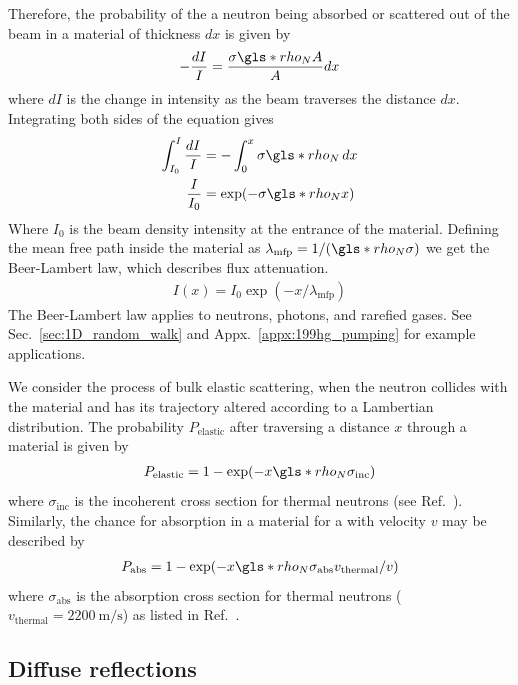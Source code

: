 Therefore, the probability of the a neutron being absorbed or scattered out of the beam in a material of thickness $dx$ is given by
%
\begin{gather}
    -\frac{dI}{I}=\frac{\sigma\gls*{rho_N} A}{A}dx
\end{gather}
%
where $dI$ is the change in intensity as the beam traverses the distance $dx$. Integrating both sides of the equation gives
%
\begin{align}
    \int^I_{I_0}\frac{dI}{I} &= -\int^x_0 \sigma \gls*{rho_N} \,dx \\
    \frac{I}{I_0} &= \exp(-\sigma \gls*{rho_N} x) \label{eq:beer_lambert_law_variant}
\end{align}
%
Where $I_0$ is the beam density intensity at the entrance of the material. Defining the mean free path inside the material as $\lambda_\text{mfp}=1/(\gls*{rho_N} \sigma)$ we get the Beer-Lambert law, which describes flux attenuation.
%
\begin{gather}
    I(x) = I_0 \exp(-x/\lambda_\text{mfp}) \label{eq:beer_lambert_law}
\end{gather}
%
 The Beer-Lambert law applies to neutrons, photons, and rarefied gases. See Sec.~\ref{sec:1D_random_walk} and Appx.~\ref{appx:199hg_pumping} for example applications.
 
 We consider the process of bulk elastic scattering, when the neutron collides with the material and has its trajectory altered according to a Lambertian distribution. The probability $P_\text{elastic}$ after traversing a distance $x$ through a material is given by
%
\begin{gather}
    P_\text{elastic}=1-\exp(-x \gls*{rho_N} \sigma_\text{inc})
\end{gather}
%
where $\sigma_\text{inc}$ is the incoherent cross section for thermal neutrons (see Ref.~\cite{nist_neutron_cross_sections}). Similarly, the chance for absorption in a material for a \ucn with velocity $v$ may be described by
%
\begin{gather}
    P_\text{abs}= 1-\exp(-x \gls*{rho_N} \sigma_\text{abs}v_\text{thermal}/v)
\end{gather}
%
where $\sigma_\text{abs}$ is the absorption cross section for thermal neutrons ($v_\text{thermal}=\qty{2200}{\meter\per \s}$) as listed in Ref.~\cite{nist_neutron_cross_sections}.


\subsection{Diffuse reflections}\label{sec:diffuse_reflections}

